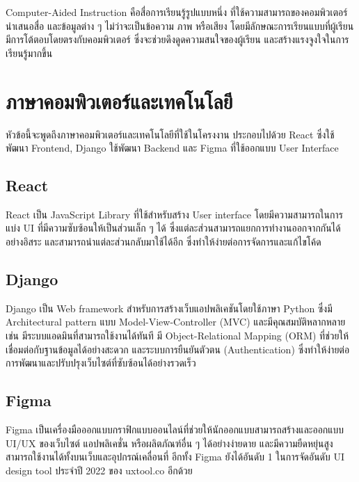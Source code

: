 \documentclass[12pt,oneside,openright,a4paper]{cpe-thai-project}
\begin{document}
\hspace{1cm}
Computer-Aided Instruction คือสื่อการเรียนรู้รูปแบบหนึ่ง ที่ใช้ความสามารถของคอมพิวเตอร์นำเสนอสื่อ และข้อมูลต่าง ๆ
ไม่ว่าจะเป็นข้อความ ภาพ หรือเสียง โดยมีลักษณะการเรียนแบบที่ผู้เรียนมีการโต้ตอบโดยตรงกับคอมพิวเตอร์
ซึ่งจะช่วยดึงดูดความสนใจของผู้เรียน และสร้างแรงจูงใจในการเรียนรู้มากขึ้น


\section{ภาษาคอมพิวเตอร์และเทคโนโลยี}

\hspace{1cm}
หัวข้อนี้จะพูดถึงภาษาคอมพิวเตอร์และเทคโนโลยีที่ใช้ในโครงงาน ประกอบไปด้วย React
ซึ่งใช้พัฒนา Frontend, Django ใช้พัฒนา Backend และ Figma ที่ใช้ออกแบบ User Interface

\subsection{React}

\hspace{1cm}
React เป็น JavaScript Library ที่ใช้สำหรับสร้าง User interface โดยมีความสามารถในการแบ่ง UI ที่มีความซับซ้อนให้เป็นส่วนเล็ก ๆ ได้
ซึ่งแต่ละส่วนสามารถแยกการทำงานออกจากกันได้อย่างอิสระ และสามารถนำแต่ละส่วนกลับมาใช้ได้อีก ซึ่งทำให้ง่ายต่อการจัดการและแก้ไขโค้ด

\subsection{Django}

\hspace{1cm}
Django เป็น Web framework สำหรับการสร้างเว็บแอปพลิเคชันโดยใช้ภาษา Python ซึ่งมี Architectural pattern
แบบ Model-View-Controller (MVC) และมีคุณสมบัติหลากหลาย เช่น มีระบบแอดมินที่สามารถใช้งานได้ทันที
มี Object-Relational Mapping (ORM) ที่ช่วยให้เชื่อมต่อกับฐานข้อมูลได้อย่างสะดวก และระบบการยืนยันตัวตน (Authentication)
ซึ่งทำให้ง่ายต่อการพัฒนาและปรับปรุงเว็บไซต์ที่ซับซ้อนได้อย่างรวดเร็ว

\subsection{Figma \cite{Figma}}

\hspace{1cm}
Figma เป็นเครื่องมือออกแบบกราฟิกแบบออนไลน์ที่ช่วยให้นักออกแบบสามารถสร้างและออกแบบ UI/UX ของเว็บไซต์
แอปพลิเคชั่น หรือผลิตภัณฑ์อื่น ๆ ได้อย่างง่ายดาย และมีความยืดหยุ่นสูง สามารถใช้งานได้ทั้งบนเว็บและอุปกรณ์เคลื่อนที่
อีกทั้ง Figma ยังได้อันดับ 1 ในการจัดอันดับ UI design tool ประจำปี 2022 ของ uxtool.co อีกด้วย
\end{document}

